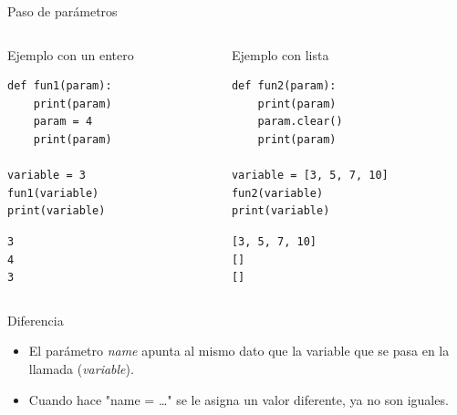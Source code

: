 \documentclass[bigger,unknownkeysallowed]{beamer}
\begin{document}
\begin{frame}[fragile,label={sec:orgaa4dfdc}]{Paso de parámetros}
 \begin{columns}
\begin{column}{0.5\columnwidth}
\begin{exampleblock}{Ejemplo con un entero}
\begin{verbatim}
def fun1(param):
    print(param)
    param = 4
    print(param)

variable = 3
fun1(variable)
print(variable)
\end{verbatim}
\scriptsize
\begin{verbatim}
3
4
3
\end{verbatim}
\end{exampleblock}
\end{column}

\begin{column}{0.5\columnwidth}
\begin{exampleblock}{Ejemplo con lista}
\begin{verbatim}
def fun2(param):
    print(param)
    param.clear()
    print(param)

variable = [3, 5, 7, 10]
fun2(variable)
print(variable)
\end{verbatim}
\scriptsize
\begin{verbatim}
[3, 5, 7, 10]
[]
[]
\end{verbatim}
\end{exampleblock}
\end{column}
\end{columns}

\begin{block}{Diferencia}
\begin{itemize}
\item El parámetro \emph{name} apunta al mismo dato que la variable que se pasa en la
llamada (\emph{variable}).

\item Cuando hace "name = \ldots{}" se le asigna un valor diferente, ya no son iguales.
\end{itemize}
\end{block}
\end{frame}
\end{document}
